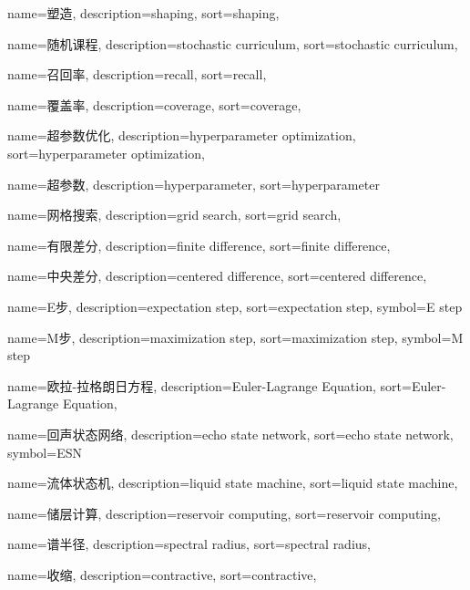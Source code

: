 {
  name=塑造, %
  description={shaping},
  sort={shaping},
}

{
  name=随机课程,
  description={stochastic curriculum},
  sort={stochastic curriculum},
}

{
  name=召回率,
  description={recall},
  sort={recall},
}

{
  name=覆盖率,
  description={coverage},
  sort={coverage},
}

{
  name=超参数优化,
  description={hyperparameter optimization},
  sort={hyperparameter optimization},
}

{
  name=超参数,
  description={hyperparameter},
  sort={hyperparameter}
}

{
  name=网格搜索,
  description={grid search},
  sort={grid search},
}

{
  name=有限差分,
  description={finite difference},
  sort={finite difference},
}

{
  name=中央差分,
  description={centered difference},
  sort={centered difference},
}

{
  name=E步,
  description={expectation step},
  sort={expectation step},
  symbol={E step}
}

{
  name=M步,
  description={maximization step},
  sort={maximization step},
  symbol={M step}
}

{
  name=欧拉-拉格朗日方程,
  description={Euler-Lagrange Equation},
  sort={Euler-Lagrange Equation},
}

{
  name=回声状态网络,
  description={echo state network},
  sort={echo state network},
  symbol={ESN}
}

{
  name=流体状态机,
  description={liquid state machine},
  sort={liquid state machine},
}

{
  name=储层计算,
  description={reservoir computing},
  sort={reservoir computing},
}

{
  name=谱半径,
  description={spectral radius},
  sort={spectral radius},
}

{
  name=收缩,
  description={contractive},
  sort={contractive},
}


